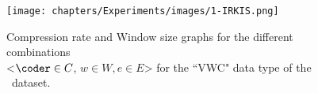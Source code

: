 \begin{figure}
\hspace{-35pt}
\texttt{[image: chapters/Experiments/images/1-IRKIS.png]}
\hspace{+10pt}
\caption{Compression rate and Window size graphs for the different combinations\\<$\coder \in C$, $w \in W, e \in E$> for the ``VWC" data type of the \datasetirkis \ dataset.}
\label{fig:mask-irkis}
\end{figure}
